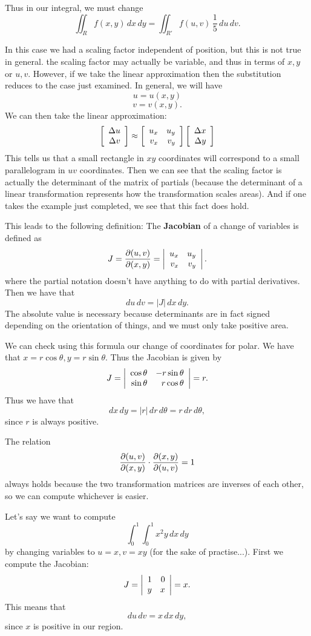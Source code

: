 Thus in our integral, we must change
\[ \iint_R f(x,y)\,dx\,dy = \iint_{R'} f(u,v)\,\frac 15\,du\,dv. \]
\eex

In this case we had a scaling factor independent of position, but this is not true in general. the scaling factor may actually be variable, and thus in terms of $x,y$ or $u,v$. However, if we take the linear approximation then the substitution reduces to the case just examined. In general, we will have
\[ u = u(x,y) \]
\[ v = v(x,y). \]
We can then take the linear approximation:
\[ \left[ \begin{array}{rrrrrrrrrrrrrrrrrrrrrrrrr} \Delta u \\ \Delta v\\ \end{array} \right] \approx \left[ \begin{array}{rrrrrrrrrrrrrrrrrrrrrrrrr} u_x & u_y \\ v_x & v_y\\ \end{array} \right]\left[ \begin{array}{rrrrrrrrrrrrrrrrrrrrrrrrr} \Delta x \\ \Delta y\\ \end{array} \right] \]
This tells us that a small rectangle in $xy$ coordinates will correspond to a small parallelogram in $uv$ coordinates. Then we can see that the scaling factor is actually the determinant of the matrix of partials (because the determinant of a linear transformation represents how the transformation scales areas). And if one takes the example just completed, we see that this fact does hold.

This leads to the following definition:
\bdf
The \textbf{Jacobian} of a change of variables is defined as
\[ J = \frac{\partial(u,v)}{\partial(x,y)} = \left| \begin{array}{rrrrrrrrrrrrrrrrrrrrrrrrr} u_x & u_y \\ v_x & v_y\\ \end{array} \right|. \]
where the partial notation doesn't have anything to do with partial derivatives. 
\edf
Then we have that 
\[ du\,dv = |J|\,dx\,dy. \]
The absolute value is necessary because determinants are in fact signed depending on the orientation of things, and we must only take positive area. 

\bex
We can check using this formula our change of coordinates for polar. We have that $x = r \cos \theta, y = r \sin \theta$. Thus the Jacobian is given by
\[ J = \left| \begin{array}{rrrrrrrrrrrrrrrrrrrrrrrrr} \cos \theta & -r \sin \theta \\ \sin \theta & r \cos \theta\\ \end{array} \right| = r. \]
Thus we have that 
\[ dx\,dy = |r|\,dr\,d\theta = r\,dr\,d\theta, \]
since $r$ is always positive.
\eex

\brm
The relation
\[ \frac{\partial(u,v)}{\partial(x,y)} \cdot \frac{\partial(x,y)}{\partial(u,v)} = 1 \]
always holds because the two transformation matrices are inverses of each other, so we can compute whichever is easier. 
\erm

\bex
Let's say we want to compute
\[ \int_0^1 \int_0^1 x^2y\,dx\,dy \]
by changing variables to $u=x,v=xy$ (for the sake of practise...). First we compute the Jacobian:
\[ J = \left| \begin{array}{rrrrrrrrrrrrrrrrrrrrrrrrr} 1 & 0 \\ y & x\\ \end{array} \right| = x. \]
This means that
\[ du\,dv = x\,dx\,dy, \]
since $x$ is positive in our region. 


